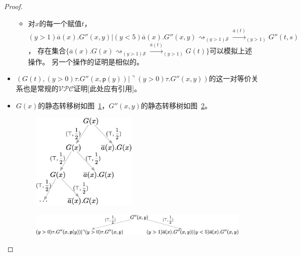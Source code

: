 \begin{proof}
\begin{itemize}
{\begin{itemize}
{               这时存在集合
               $$\{(y>1)\overline{a}(x).G''(x,y)|(y<5)\overline{a}(x).G''(x,y)\rightsquigarrow_{(y>1)\mathcal{S}}\stackrel{\overline{a}(t)}{\rightarrow}_{(y>1)}G''(t,s),$$
               $$(y>1)\overline{a}(x).G''(x,y)|(y<5)\overline{a}(x).G''(x,y)\rightsquigarrow_{(y\leq 1)\mathcal{S}}\stackrel{\overline{a}(t)}{\rightarrow}_{(y<5)}G''(t,s)\}$$
               可以模拟上述操作。
            }
            \item {
               对$x$的每一个赋值$t$，
               $(y>1)\overline{a}(x).G''(x,y)|(y<5)\overline{a}(x).G''(x,y)\rightsquigarrow_{(y>1)\mathcal{S}}\stackrel{\overline{a}(t)}{\rightarrow}_{(y>1)}G''(t,s)$，
               存在集合$\{\overline{a}(x).G(x)\rightsquigarrow_{(y>1)\mathcal{S}}\stackrel{\overline{a}(t)}{\longrightarrow}_{(y>1)}G(t)\}$可以模拟上述操作。
               另一个操作的证明是相似的。
            }
         \end{itemize}
      }
      \item {
         $(G(t),(y>0)\tau.G''(x,\mathsf{p}(y))|\urcorner (y>0)\tau.G''(x,y))$的这一对等价关系也是常规的$\mathcal{VPC}$证明[此处应有引用]。
      }
      \item {
         $G(x)$的静态转移树如图~\ref{fig_eg4_1}，$G''(x,y)$的静态转移树如图~\ref{fig_eg4_2}。
         \begin{figure}[!htbp]
            \caption[]{}
            \small
            \centering
            \includegraphics[width=5cm]{../figure/example1.png}
             \label{fig_eg4_1}
         \end{figure}
         \begin{figure}[!htbp]
            \caption[]{}
            \small
            \centering
            \includegraphics[width=13cm]{../figure/example4_2.png}
             \label{fig_eg4_2}
         \end{figure}

}
\end{itemize}
\end{proof}
